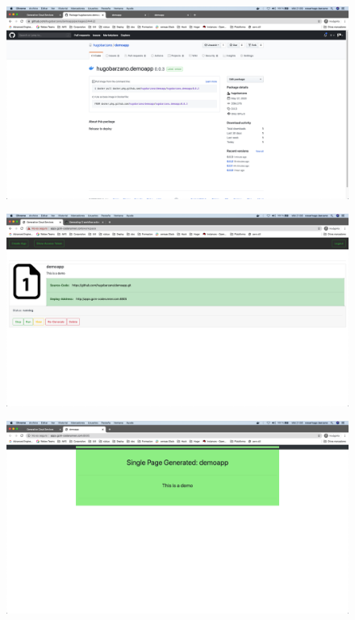 \documentclass[a4paper,11pt]{book}
\begin{document}
   \begin{figure}[H]
\centering
\includegraphics[scale=0.2]{imagenes/casouso/4_7.png}
\caption{   }
\end{figure}


   \begin{figure}[H]
\centering
\includegraphics[scale=0.2]{imagenes/casouso/4_8.png}
\caption{   }
\end{figure}


   \begin{figure}[H]
\centering
\includegraphics[scale=0.2]{imagenes/casouso/4_9.png}
\caption{   }
\end{figure}
\end{document}
